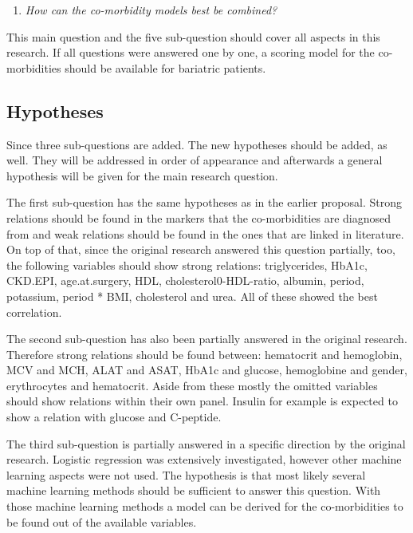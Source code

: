 \documentclass[10pt,a4paper]{article}
\begin{document}
	\begin{enumerate}[resume]
		\item \emph{How can the co-morbidity models best be combined?}
	\end{enumerate}
	
	This main question and the five sub-question should cover all aspects in this research. If all questions were answered one by one, a scoring model for the co-morbidities should be available for bariatric patients.
	
	\subsection{Hypotheses}
	
	Since three sub-questions are added. The new hypotheses should be added, as well. They will be addressed in order of appearance and afterwards a general hypothesis will be given for the main research question.
	
	The first sub-question has the same hypotheses as in the earlier proposal. Strong relations should be found in the markers that the co-morbidities are diagnosed from and weak relations should be found in the ones that are linked in literature. On top of that, since the original research answered this question partially, too, the following variables should show strong relations: triglycerides, HbA1c, CKD.EPI, age.at.surgery, HDL, cholesterol0-HDL-ratio, albumin, period, potassium, period * BMI, cholesterol and urea. All of these showed the best correlation.
	
	The second sub-question has also been partially answered in the original research. Therefore strong relations should be found between: hematocrit and hemoglobin, MCV and MCH, ALAT and ASAT, HbA1c and glucose, hemoglobine and gender, erythrocytes and hematocrit. Aside from these mostly the omitted variables should show relations within their own panel. Insulin for example is expected to show a relation with glucose and C-peptide.
	
	The third sub-question is partially answered in a specific direction by the original research. Logistic regression was extensively investigated, however other machine learning aspects were not used. The hypothesis is that most likely several machine learning methods should be sufficient to answer this question. With those machine learning methods a model can be derived for the co-morbidities to be found out of the available variables.
	 
\end{document}
